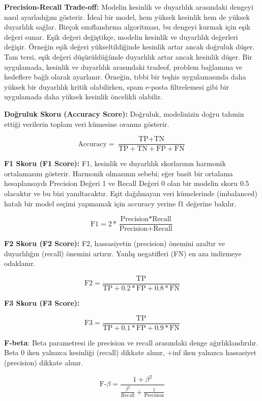 \textbf{Precision-Recall Trade-off:} Modelin kesinlik ve duyarlılık arasındaki dengeyi nasıl ayarladığını gösterir. İdeal bir model, hem yüksek kesinlik hem de yüksek duyarlılık sağlar. Birçok sınıflandırma algoritması, bu dengeyi kurmak için eşik değeri sunar. Eşik değeri değiştikçe, modelin kesinlik ve duyarlılık değerleri değişir. Örneğin eşik değeri yükseltildiğinde kesinlik artar ancak doğruluk düşer. Tam tersi, eşik değeri düşürüldüğünde duyarlılık artar ancak kesinlik düşer. Bir uygulamada, kesinlik ve duyarlılık arasındaki tradeof, problem bağlamına ve hedeflere bağlı olarak ayarlanır. Örneğin, tıbbi bir teşhis uygulamasında daha yüksek bir duyarlılık kritik olabilirken, spam e-posta filtrelemesi gibi bir uygulamada daha yüksek kesinlik öncelikli olabilir.

\textbf{Doğruluk Skoru (Accuracy Score):} Doğruluk, modelinizin doğru tahmin ettiği verilerin toplam veri kümesine oranını gösterir.

\[\text{Accuracy} = \frac{\text{TP} + \text{TN}}{\text{TP} + \text{TN} + \text{FP} + \text{FN}}\]

\textbf{F1 Skoru (F1 Score):} F1, kesinlik ve duyarlılık skorlarının harmonik ortalamasını gösterir. Harmonik olmasının sebebi; eğer basit bir ortalama hesaplansaydı Precision Değeri 1 ve Recall Değeri 0 olan bir modelin skoru 0.5 olacaktır ve bu bizi yanıltacaktır. Eşit dağılmayan veri kümelerinde (imbalanced) hatalı bir model seçimi yapmamak için accuracy yerine f1 değerine bakılır.

\[\text{F1} = 2 * \frac{\text{Precision} * \text{Recall}}{\text{Precision} + \text{Recall}}\]

\textbf{F2 Skoru (F2 Score):} F2, hassasiyetin (precision) önemini azaltır ve duyarlılığın (recall) önemini artırır. Yanlış negatifleri (FN) en aza indirmeye odaklanır.

\[\text{F2} = \frac{\text{TP}}{\text{TP} + 0.2 * \text{FP} + 0.8 * \text{FN}}\]

\textbf{F3 Skoru (F3 Score):}

\[\text{F3} = \frac{\text{TP}}{\text{TP} + 0.1 * \text{FP} + 0.9 * \text{FN}}\]

\textbf{F-beta}: Beta parametresi ile precision ve recall arasındaki denge ağırlıklandırılır. Beta 0 iken yalnızca kesinliği (recall) dikkate alınır, +inf iken yalnızca hassasiyet (precision) dikkate alınır.

\[\text{F-}\beta = \frac{1 + \beta^2}{\frac{\beta^2}{\text{Recall}} + \frac{1}{\text{Precision}}}\]

